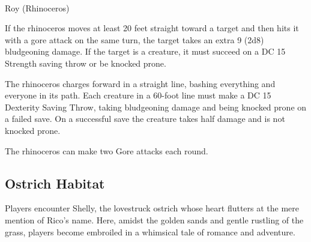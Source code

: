 \hfil\\\eject
\begin{DndMonster}[width=0.5\textwidth]{Roy (Rhinoceros)}

	\DndMonsterBasics[
		armor-class = {17 (Natural Armor)},
		hit-points  = {\DndDice{20d10 + 40}},
		speed       = {40 ft.},
	]

	\renewcommand{\AbilityScoreSpacer}{~}

	\DndMonsterAbilityScores[
		str = 21,
		dex = 8,
		con = 15,
		int = 2,
		wis = 12,
		cha = 6,
	]

	\DndMonsterDetails[
		skills = {Perception +1},
		senses = {passive Perception 11},
		languages = {Common},
		challenge = 6,
	]

	If the rhinoceros moves at least 20 feet straight toward a target and then hits it with a gore attack on the same turn, the target takes an extra 9 (2d8) bludgeoning damage. If the target is a creature, it must succeed on a DC 15 Strength saving throw or be knocked prone.
	
	 The rhinoceros charges forward in a straight line, bashing everything and everyone in its path. Each creature in a 60-foot line must make a DC 15 Dexterity Saving Throw, taking  bludgeoning damage and being knocked prone on a failed save. On a successful save the creature takes half damage and is not knocked prone.
	
	The rhinoceros can make two Gore attacks each round.
	
	\DndMonsterAttack[
		name=Gore,
		distance=melee, %
		mod=+7,
		reach=5,
		targets=one target,
		dmg={\DndDice{2d8 + 5}},
		dmg-type=piercing,
	]
\end{DndMonster}
\subsection*{ Ostrich Habitat}
Players encounter Shelly, the lovestruck ostrich whose heart flutters at the mere mention of Rico's name. Here, amidst the golden sands and gentle rustling of the grass, players become embroiled in a whimsical tale of romance and adventure.


